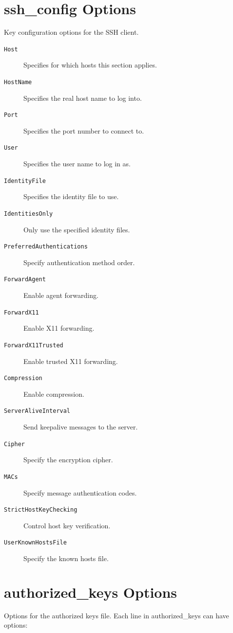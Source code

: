 \documentclass[12pt]{book}
\begin{document}
\section{ssh\_config Options}

Key configuration options for the SSH client.

\begin{description}
    \item[\texttt{Host}] Specifies for which hosts this section applies.
    \item[\texttt{HostName}] Specifies the real host name to log into.
    \item[\texttt{Port}] Specifies the port number to connect to.
    \item[\texttt{User}] Specifies the user name to log in as.
    \item[\texttt{IdentityFile}] Specifies the identity file to use.
    \item[\texttt{IdentitiesOnly}] Only use the specified identity files.
    \item[\texttt{PreferredAuthentications}] Specify authentication method order.
    \item[\texttt{ForwardAgent}] Enable agent forwarding.
    \item[\texttt{ForwardX11}] Enable X11 forwarding.
    \item[\texttt{ForwardX11Trusted}] Enable trusted X11 forwarding.
    \item[\texttt{Compression}] Enable compression.
    \item[\texttt{ServerAliveInterval}] Send keepalive messages to the server.
    \item[\texttt{Cipher}] Specify the encryption cipher.
    \item[\texttt{MACs}] Specify message authentication codes.
    \item[\texttt{StrictHostKeyChecking}] Control host key verification.
    \item[\texttt{UserKnownHostsFile}] Specify the known hosts file.
\end{description}

\section{authorized\_keys Options}

Options for the authorized keys file. Each line in authorized_keys can have options:
\end{document}
